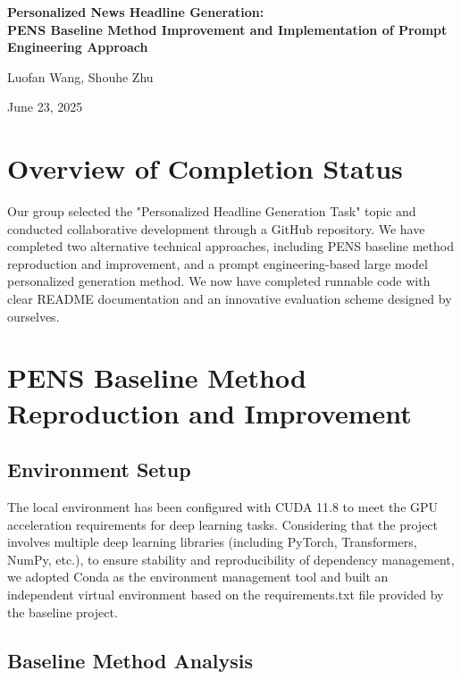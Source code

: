 \documentclass[10pt,a4paper]{article}
\begin{document}
\begin{center}
    \LARGE{\textbf{Personalized News Headline Generation:\\ PENS Baseline Method Improvement and Implementation of Prompt Engineering Approach}}
    
    \vspace{0.5cm}
    \large{Luofan Wang, Shouhe Zhu}
    
    \large{June 23, 2025}
\end{center}

\section{Overview of Completion Status}
Our group selected the "Personalized Headline Generation Task" topic and conducted collaborative development through a GitHub repository. We have completed two alternative technical approaches, including PENS baseline method reproduction and improvement, and a prompt engineering-based large model personalized generation method. We now have completed runnable code with clear README documentation and an innovative evaluation scheme designed by ourselves.

\section{PENS Baseline Method Reproduction and Improvement}
\subsection{Environment Setup}
The local environment has been configured with CUDA 11.8 to meet the GPU acceleration requirements for deep learning tasks. Considering that the project involves multiple deep learning libraries (including PyTorch, Transformers, NumPy, etc.), to ensure stability and reproducibility of dependency management, we adopted Conda as the environment management tool and built an independent virtual environment based on the requirements.txt file provided by the baseline project.

\subsection{Baseline Method Analysis}
\end{document}
